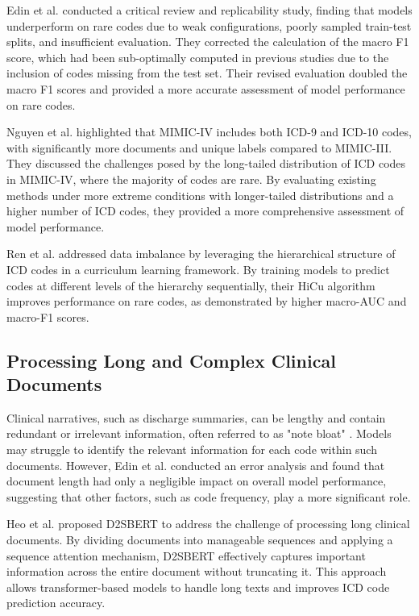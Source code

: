 \documentclass[12pt,a4paper]{report}
\begin{document}
Edin et al. \cite{edin2023automated} conducted a critical review and replicability study, finding that models underperform on rare codes due to weak configurations, poorly sampled train-test splits, and insufficient evaluation. They corrected the calculation of the macro F1 score, which had been sub-optimally computed in previous studies due to the inclusion of codes missing from the test set. Their revised evaluation doubled the macro F1 scores and provided a more accurate assessment of model performance on rare codes.

Nguyen et al. \cite{nguyen2023mimic} highlighted that MIMIC-IV includes both ICD-9 and ICD-10 codes, with significantly more documents and unique labels compared to MIMIC-III. They discussed the challenges posed by the long-tailed distribution of ICD codes in MIMIC-IV, where the majority of codes are rare. By evaluating existing methods under more extreme conditions with longer-tailed distributions and a higher number of ICD codes, they provided a more comprehensive assessment of model performance.

Ren et al. \cite{ren2022hicu} addressed data imbalance by leveraging the hierarchical structure of ICD codes in a curriculum learning framework. By training models to predict codes at different levels of the hierarchy sequentially, their HiCu algorithm improves performance on rare codes, as demonstrated by higher macro-AUC and macro-F1 scores.

\subsection{Processing Long and Complex Clinical Documents}

Clinical narratives, such as discharge summaries, can be lengthy and contain redundant or irrelevant information, often referred to as "note bloat" \cite{wrenn2010quantifying}. Models may struggle to identify the relevant information for each code within such documents. However, Edin et al. \cite{edin2023automated} conducted an error analysis and found that document length had only a negligible impact on overall model performance, suggesting that other factors, such as code frequency, play a more significant role.

Heo et al. \cite{heo2022medical} proposed D2SBERT to address the challenge of processing long clinical documents. By dividing documents into manageable sequences and applying a sequence attention mechanism, D2SBERT effectively captures important information across the entire document without truncating it. This approach allows transformer-based models to handle long texts and improves ICD code prediction accuracy.
\end{document}
